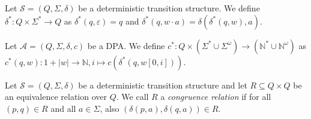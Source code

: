 \begin{defn}
	Let $\mathcal{S} = (Q, \Sigma, \delta)$ be a deterministic transition structure. We define $\delta^* : Q \times \Sigma^* \rightarrow Q$ as $\delta^*(q, \varepsilon) = q$ and $\delta^*(q, w \cdot a) = \delta(\delta^*(q, w), a)$.
\end{defn}

\begin{defn}
	Let $\mathcal{A} = (Q, \Sigma, \delta, c)$ be a DPA. We define $c^* : Q \times (\Sigma^* \cup \Sigma^\omega) \rightarrow (\mathbb{N}^* \cup \mathbb{N}^\omega)$ as $c^*(q, w) : 1+|w| \rightarrow \mathbb{N}, i \mapsto c(\delta^*(q, w[0, i]))$.
\end{defn}

\begin{defn}
	Let $\mathcal{S} = (Q, \Sigma, \delta)$ be a deterministic transition structure and let $R \subseteq Q \times Q$ be an equivalence relation over $Q$. We call $R$ a \emph{congruence relation} if for all $(p, q) \in R$ and all $a \in \Sigma$, also $(\delta(p, a), \delta(q, a)) \in R$.
\end{defn}

